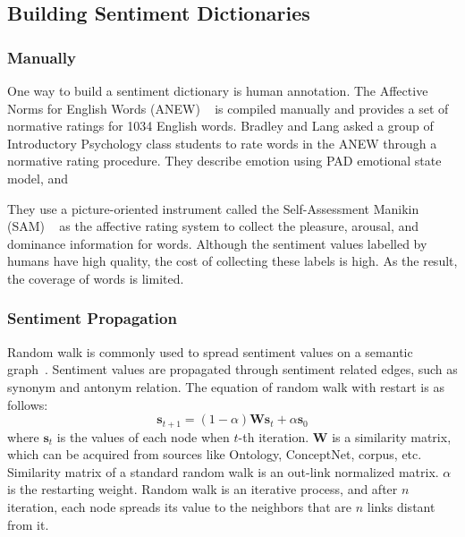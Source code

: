 \subsection{Building Sentiment Dictionaries}
\subsubsection{Manually}
One way to build a sentiment dictionary is human annotation. The Affective Norms for English Words (ANEW) ~\cite{Bradley:ANEW99} is compiled manually and provides a set of normative ratings for 1034 English words. Bradley and Lang asked a group of Introductory Psychology class students to rate words in the ANEW through a normative rating procedure. They describe emotion using PAD emotional state model, and 

They use a picture-oriented instrument called the Self-Assessment Manikin (SAM) ~\cite{Lang:behavioral80} as the affective rating system to collect the pleasure, arousal, and dominance information for words. Although the sentiment values labelled by humans have high quality, the cost of collecting these labels is high. As the result, the coverage of words is limited.

\subsubsection{Sentiment Propagation}
Random walk is commonly used to spread sentiment values on a semantic graph~\cite{Wu:relSelect14, Hassan:ACL10, Xu:COLING10, Cambria:AAAI10}. Sentiment values are propagated through sentiment related edges, such as synonym and antonym relation. The equation of random walk with restart is as follows:
\begin{equation}
\label{eq:rndWalk}
\boldsymbol{s}_{t+1} = (1-\alpha)\boldsymbol{W}\boldsymbol{s}_t + \alpha\boldsymbol{s}_0
\end{equation}
where $\boldsymbol{s}_t$ is the values of each node when $t$-th iteration. $\boldsymbol{W}$ is a similarity matrix, which can be acquired from sources like Ontology, ConceptNet, corpus, etc. Similarity matrix of a standard random walk is an out-link normalized matrix. $\alpha$ is the restarting weight. Random walk is an iterative process, and after $n$ iteration, each node spreads its value to the neighbors that are $n$ links distant from it.

